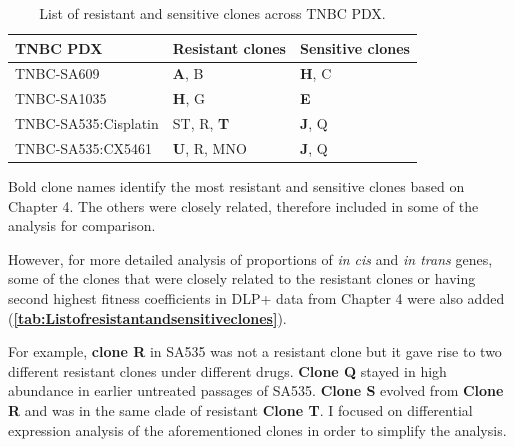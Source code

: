  \begin{table}[bp]
   
   \centering
   \caption{List of resistant and sensitive clones across TNBC PDX.} 
     \begin{tabular}{|l|l|l|}
      \hline
     TNBC PDX & Resistant clones & Sensitive clones \\
     \hline
     TNBC-SA609  & \textbf{A}, B & \textbf{H}, C \\
     TNBC-SA1035 & \textbf{H}, G & \textbf{E} \\
     TNBC-SA535:Cisplatin & ST, R, \textbf{T} &  \textbf{J}, Q \\
     TNBC-SA535:CX5461 & \textbf{U}, R, MNO &  \textbf{J}, Q \\  
     \hline
     \end{tabular}%
   
   \label{tab:Listofresistantandsensitiveclones}%
 
 \small{Bold clone names identify the most resistant and sensitive clones based on Chapter 4. The others were closely related, therefore included in some of the analysis for comparison}.  
 
 \end{table}%
However, for more detailed analysis of proportions of \textit{in cis} and  \textit{in trans} genes, some of the clones that  were closely related to the resistant clones or having second highest fitness coefficients in DLP+ data from Chapter 4 were also added (\textbf{\autoref{tab:Listofresistantandsensitiveclones}}). 

For example, \textbf{clone R} in SA535 was not a resistant clone but it gave rise to two different resistant clones under different drugs. \textbf{Clone Q} stayed in high abundance in earlier untreated passages of SA535. \textbf{Clone S} evolved from \textbf{Clone R} and was in the same clade of resistant \textbf{Clone T}.
I focused on differential expression analysis of the aforementioned clones in order to simplify the analysis.

